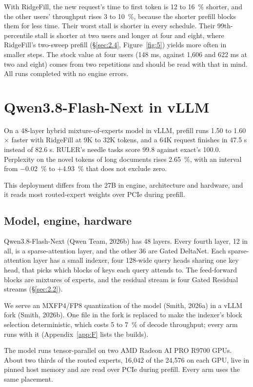 \documentclass[11pt]{article}
\begin{document}
With RidgeFill, the new request's time to first token is 12 to 16~\% shorter, and the other users' throughput rises 3 to 10~\%, because the shorter prefill blocks them for less time. Their worst stall is shorter in every schedule. Their 99th-percentile stall is shorter at two users and longer at four and eight, where RidgeFill's two-sweep prefill (\S\ref{sec:2.4}, Figure~\ref{fig:5}) yields more often in smaller steps. The stock value at four users (148 ms, against 1,606 and 622 ms at two and eight) comes from two repetitions and should be read with that in mind. All runs completed with no engine errors.


\section{Qwen3.8-Flash-Next in vLLM}\label{sec:5}
On a 48-layer hybrid mixture-of-experts model in vLLM, prefill runs 1.50 to 1.60$\times$ faster with RidgeFill at 9K to 32K tokens, and a 64K request finishes in 47.5 s instead of 82.6 s. RULER's needle tasks score 99.8 against exact's 100.0. Perplexity on the novel tokens of long documents rises 2.65~\%, with an interval from $-$0.02~\% to +4.93~\% that does not exclude zero.

This deployment differs from the 27B in engine, architecture and hardware, and it reads most routed-expert weights over PCIe during prefill.


\subsection{Model, engine, hardware}\label{sec:5.1}
Qwen3.8-Flash-Next (Qwen Team, 2026b) has 48 layers. Every fourth layer, 12 in all, is a sparse-attention layer, and the other 36 are Gated DeltaNet. Each sparse-attention layer has a small indexer, four 128-wide query heads sharing one key head, that picks which blocks of keys each query attends to. The feed-forward blocks are mixtures of experts, and the residual stream is four Gated Residual streams (\S\ref{sec:2.2}).

We serve an MXFP4/FP8 quantization of the model (Smith, 2026a) in a vLLM fork (Smith, 2026b). One file in the fork is replaced to make the indexer's block selection deterministic, which costs 5 to 7~\% of decode throughput; every arm runs with it (Appendix~\ref{app:F} lists the builds).

The model runs tensor-parallel on two AMD Radeon AI PRO R9700 GPUs. About two thirds of the routed experts, 16,042 of the 24,576 on each GPU, live in pinned host memory and are read over PCIe during prefill. Every arm uses the same placement.
\end{document}
